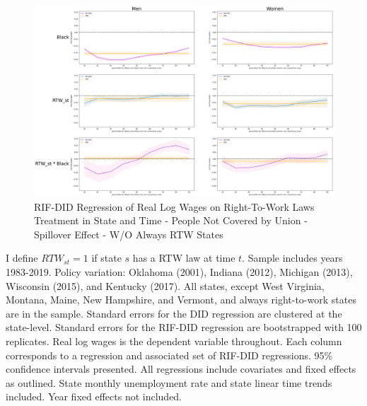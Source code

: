 \documentclass[11pt]{article}
\begin{document}
{\pagebreak
\begin{landscape}
\begin{figure}[ht!]
\centering
    \caption{RIF-DID Regression of Real Log Wages on Right-To-Work Laws Treatment in State and Time - People Not Covered by Union - Spillover Effect - W/O Always RTW States}\label{fig:rifdid-sltt-wo-ar2w-B}
    \includegraphics[width=1.25\textwidth, height = \textheight, keepaspectratio]{figures/fin_rifdid-sltt-wo-ar2w-B.png}
\end{figure}
\footnotesize{I define $RTW_{st} = 1$ if state $s$ has a RTW law at time $t$. Sample includes years 1983-2019. Policy variation: Oklahoma (2001), Indiana (2012), Michigan (2013), Wisconsin (2015), and Kentucky (2017). All states, except West Virginia, Montana, Maine, New Hampshire, and Vermont, and always right-to-work states are in the sample. Standard errors for the DID regression are clustered at the state-level. Standard errors for the RIF-DID regression are bootstrapped with 100 replicates. Real log wages is the dependent variable throughout. Each column corresponds to a regression and associated set of RIF-DID regressions. 95\% confidence intervals presented. All regressions include covariates and fixed effects as outlined. State monthly unemployment rate and state linear time trends included. Year fixed effects not included.}
\end{landscape}

}
\end{document}
